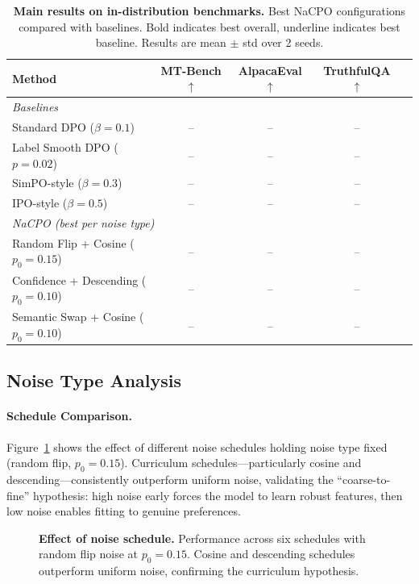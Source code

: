 \documentclass{article}
\begin{document}
\begin{table}[t]
\centering
\caption{\textbf{Main results on in-distribution benchmarks.} Best NaCPO configurations compared with baselines. Bold indicates best overall, underline indicates best baseline. Results are mean $\pm$ std over 2 seeds.}
\label{tab:main_results}
\small
\begin{tabular}{@{}lcccc@{}}
\toprule
\textbf{Method} & \textbf{MT-Bench} $\uparrow$ & \textbf{AlpacaEval} $\uparrow$ & \textbf{TruthfulQA} $\uparrow$ \\
\midrule
\multicolumn{4}{l}{\textit{Baselines}} \\
Standard DPO ($\beta{=}0.1$) & -- & -- & -- \\
Label Smooth DPO ($p{=}0.02$) & -- & -- & -- \\
SimPO-style ($\beta{=}0.3$) & -- & -- & -- \\
IPO-style ($\beta{=}0.5$) & -- & -- & -- \\
\midrule
\multicolumn{4}{l}{\textit{NaCPO (best per noise type)}} \\
Random Flip + Cosine ($p_0{=}0.15$) & -- & -- & -- \\
Confidence + Descending ($p_0{=}0.10$) & -- & -- & -- \\
Semantic Swap + Cosine ($p_0{=}0.10$) & -- & -- & -- \\
\bottomrule
\end{tabular}
\end{table}


\subsection{Noise Type Analysis}


\paragraph{Schedule Comparison.}
Figure~\ref{fig:schedule_comparison} shows the effect of different noise schedules holding noise type fixed (random flip, $p_0{=}0.15$).
Curriculum schedules---particularly cosine and descending---consistently outperform uniform noise, validating the ``coarse-to-fine'' hypothesis: high noise early forces the model to learn robust features, then low noise enables fitting to genuine preferences.

\begin{figure}[t]
\centering
\caption{\textbf{Effect of noise schedule.} Performance across six schedules with random flip noise at $p_0{=}0.15$. Cosine and descending schedules outperform uniform noise, confirming the curriculum hypothesis.}
\label{fig:schedule_comparison}
\end{figure}
\end{document}
